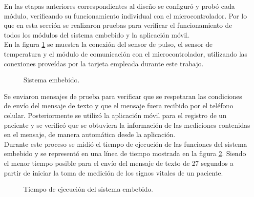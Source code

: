 En las etapas anteriores correspondientes al diseño se configuró y probó cada módulo, verificando su funcionamiento individual con el microcontrolador. Por lo que en esta sección se realizaron pruebas para verificar el funcionamiento de todos los módulos del sistema embebido y la aplicación móvil. \\

En la figura \ref{fig:integracion} se muestra la conexión del sensor de pulso, el sensor de temperatura y el módulo de comunicación con el microcontrolador, utilizando las conexiones proveídas por la tarjeta empleada durante este trabajo. \\

\begin{figure}[htbp!]
	\centering
	\caption{Sistema embebido.}
	\label{fig:integracion}
\end{figure}

Se enviaron mensajes de prueba para verificar que se respetaran las condiciones de envío del mensaje de texto y que el mensaje fuera recibido por el teléfono celular. Posteriormente se utilizó la aplicación móvil para el registro de un paciente y se verificó que se obtuviera la información de las mediciones contenidas en el mensaje, de manera automática desde la aplicación. \\

Durante este proceso se midió el tiempo de ejecución de las funciones del sistema embebido y se representó en una línea de tiempo mostrada en la figura \ref{fig:tiempoSistemaEmbebido}. Siendo el menor tiempo posible para el envío del mensaje de texto de 27 segundos a partir de iniciar la toma de medición de los signos vitales de un paciente.

\begin{figure}[htbp!]
	\centering
	\caption{Tiempo de ejecución del sistema embebido.}
	\label{fig:tiempoSistemaEmbebido}
\end{figure}
